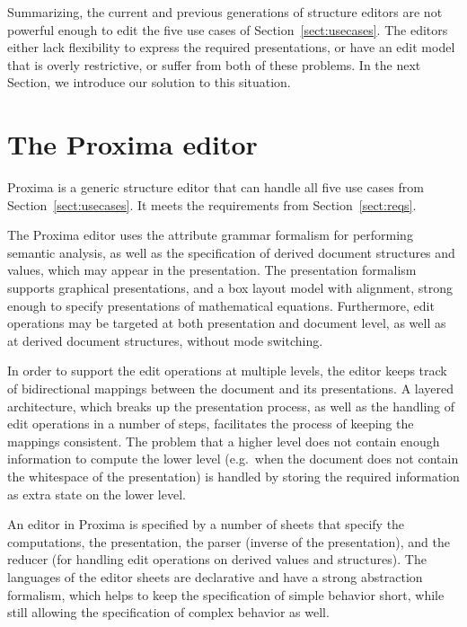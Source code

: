 Summarizing, the current and previous generations of structure editors are not powerful enough to edit the five use cases of Section~\ref{sect:usecases}. The editors either lack flexibility to express the required presentations, or have an edit model that is overly restrictive, or suffer from both of these problems. In the next Section, we introduce our solution to this situation.

\section{The Proxima editor}

Proxima is a generic structure editor that can handle all five use cases from Section~\ref{sect:usecases}. It meets the requirements from Section~\ref{sect:reqs}.

The Proxima editor uses the attribute grammar formalism for performing semantic analysis, as well as the specification of derived document structures and values, which may appear in the presentation. The presentation formalism supports graphical presentations, and a box layout model with alignment, strong enough to specify presentations of mathematical equations. Furthermore, edit operations may be targeted at both presentation and document level, as well as at derived document structures, without mode switching.

In order to support the edit operations at multiple levels, the editor keeps track of bidirectional mappings between the document and its presentations. A layered architecture, which breaks up the presentation process, as well as the handling of edit operations in a number of steps, facilitates the process of keeping the mappings consistent. The problem that a higher level does not contain enough information to compute the lower level (e.g.\ when the document does not contain the  whitespace of the presentation) is handled by storing the required information as extra state on the lower level. 


An editor in Proxima is specified by a number of sheets that specify the computations, the presentation, the parser (inverse of the presentation), and the reducer (for handling edit operations on derived values and structures). The languages of the editor sheets are declarative and have a strong abstraction formalism, which helps to keep the specification of simple behavior short, while still allowing the specification of complex behavior as well.

